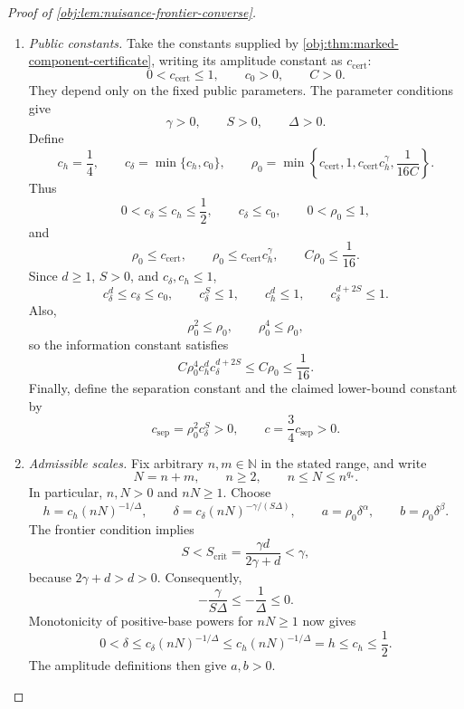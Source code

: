 \documentclass[11pt]{article}
\begin{document}
\begin{proof}[Proof of \cref{obj:lem:nuisance-frontier-converse}]
\begin{enumerate}
\item \textit{Public constants.}
Take the constants supplied by \cref{obj:thm:marked-component-certificate}, writing its amplitude constant as \(c_{\mathrm{cert}}\):
\[
0<c_{\mathrm{cert}}\le1,\qquad c_0>0,\qquad C>0.
\]
They depend only on the fixed public parameters. The parameter conditions give
\[
\gamma>0,\qquad S>0,\qquad \Delta>0.
\]
Define
\[
c_h=\frac14,\qquad
c_\delta=\min\{c_h,c_0\},\qquad
\rho_0=\min\left\{
c_{\mathrm{cert}},1,c_{\mathrm{cert}}c_h^\gamma,
\frac1{16C}
\right\}.
\]
Thus
\[
0<c_\delta\le c_h\le\frac12,\qquad
c_\delta\le c_0,\qquad
0<\rho_0\le1,
\]
and
\[
\rho_0\le c_{\mathrm{cert}},\qquad
\rho_0\le c_{\mathrm{cert}}c_h^\gamma,\qquad
C\rho_0\le\frac1{16}.
\]
Since \(d\ge1\), \(S>0\), and \(c_\delta,c_h\le1\),
\[
c_\delta^d\le c_\delta\le c_0,\qquad
c_\delta^S\le1,\qquad
c_h^d\le1,\qquad
c_\delta^{d+2S}\le1.
\]
Also,
\[
\rho_0^2\le\rho_0,\qquad \rho_0^4\le\rho_0,
\]
so the information constant satisfies
\[
C\rho_0^4c_h^dc_\delta^{d+2S}
\le C\rho_0\le\frac1{16}.
\]
Finally, define the separation constant and the claimed lower-bound constant by
\[
c_{\mathrm{sep}}=\rho_0^2c_\delta^S>0,
\qquad
c=\frac34c_{\mathrm{sep}}>0.
\]

\item \textit{Admissible scales.}
Fix arbitrary \(n,m\in\mathbb N\) in the stated range, and write
\[
N=n+m,\qquad n\ge2,\qquad n\le N\le n^{q_*}.
\]
In particular, \(n,N>0\) and \(nN\ge1\). Choose
\[
h=c_h(nN)^{-1/\Delta},\qquad
\delta=c_\delta(nN)^{-\gamma/(S\Delta)},\qquad
a=\rho_0\delta^\alpha,\qquad
b=\rho_0\delta^\beta.
\]
The frontier condition implies
\[
S<S_{\mathrm{crit}}
=\frac{\gamma d}{2\gamma+d}<\gamma,
\]
because \(2\gamma+d>d>0\). Consequently,
\[
-\frac{\gamma}{S\Delta}\le-\frac1\Delta\le0.
\]
Monotonicity of positive-base powers for \(nN\ge1\) now gives
\[
0<\delta
\le c_\delta(nN)^{-1/\Delta}
\le c_h(nN)^{-1/\Delta}
=h
\le c_h\le\frac12.
\]
The amplitude definitions then give \(a,b>0\).


\end{enumerate}
\end{proof}
\end{document}
